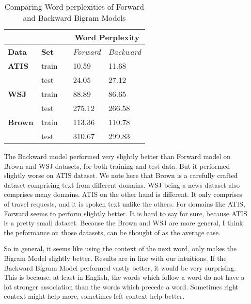 \documentclass{article}
\begin{document}
\begin{table}[h]
\centering
\begin{tabular}{@{}lllll@{}}
\toprule
\textbf{}      & \textbf{}    &  & \multicolumn{2}{c}{\textbf{Word Perplexity}} \\ \midrule
\textbf{Data}  & \textbf{Set} &  & \textit{Forward}     & \textit{Backward}     \\ \midrule
\textbf{ATIS}  & train        &  & 10.59               & 11.68               \\ \midrule
               & test         &  & 24.05               & 27.12                \\ \midrule
\textbf{WSJ}   & train        &  & 88.89               & 86.65                \\ \midrule
               & test         &  & 275.12               & 266.58               \\ \midrule
\textbf{Brown} & train        &  & 113.36              & 110.78                \\ \midrule
               & test         &  & 310.67              & 299.83               \\ \bottomrule
\end{tabular}
\caption{Comparing Word perplexities of Forward and Backward Bigram Models}
\label{backvforw}
\end{table}
The Backward model performed very slightly better than Forward model on Brown and WSJ datasets, for both training and test data. But it performed slightly worse on ATIS dataset. We note here that Brown is a carefully crafted dataset comprising text from different domains. WSJ being a news dataset also comprises many domains. ATIS on the other hand is different. It only comprises of travel requests, and it is spoken text unlike the others. For domains like ATIS, Forward seems to perform slightly better. It is hard to say for sure, because ATIS is a pretty small dataset. Because the Brown and WSJ are more general, I think the peformance on those datasets, can be thought of as the average case. 

So in general, it seems like using the context of the next word, only makes the Bigram Model slightly better. Results are in line with our intuitions. If the Backward Bigram Model performed vastly better, it would be very surprising. This is because, at least in English, the words which follow a word do not have a lot stronger association than the words which precede a word. Sometimes right context might help more, sometimes left context help better. 
\end{document}
